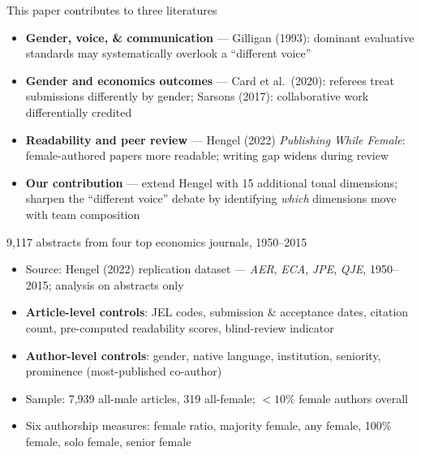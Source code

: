 \documentclass[aspectratio=169,11pt]{beamer}
\begin{document}
\begin{frame}{This paper contributes to three literatures}
    \vfill
    \RaggedRight
    {\normalsize
    \begin{itemize}\setlength\itemsep{0.3cm}
        \item \textbf{Gender, voice, \& communication} --- Gilligan (1993): dominant evaluative standards may systematically overlook a ``different voice''
        \item \textbf{Gender and economics outcomes} --- Card et al.\ (2020): referees treat submissions differently by gender; Sarsons (2017): collaborative work differentially credited
        \item \textbf{Readability and peer review} --- Hengel (2022) \textit{Publishing While Female}: female-authored papers more readable; writing gap widens during review
        \item \textbf{Our contribution} --- extend Hengel with 15 additional tonal dimensions; sharpen the ``different voice'' debate by identifying \textit{which} dimensions move with team composition
    \end{itemize}
    }
    \vfill
\end{frame}

\begin{frame}{9,117 abstracts from four top economics journals, 1950--2015}
    \vfill
    \RaggedRight
    {\normalsize
    \begin{itemize}\setlength\itemsep{0.28cm}
        \item Source: Hengel (2022) replication dataset --- \textit{AER}, \textit{ECA}, \textit{JPE}, \textit{QJE}, 1950--2015; analysis on abstracts only
        \item \textbf{Article-level controls}: JEL codes, submission \& acceptance dates, citation count, pre-computed readability scores, blind-review indicator
        \item \textbf{Author-level controls}: gender, native language, institution, seniority, prominence (most-published co-author)
        \item Sample: 7,939 all-male articles, 319 all-female; $<\!10\%$ female authors overall
        \item Six authorship measures: female ratio, majority female, any female, 100\% female, solo female, senior female
    \end{itemize}
    }
    \vfill
\end{frame}
\end{document}
